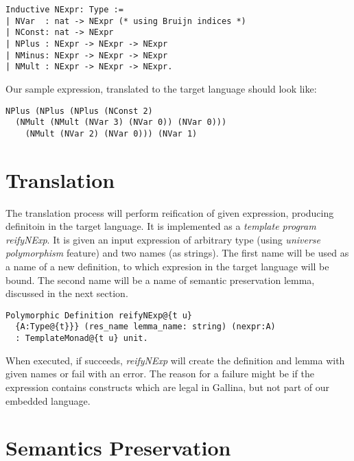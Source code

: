 \documentclass[sigplan]{acmart}\settopmatter{printfolios=true,printccs=false,printacmref=false}
\begin{document}
\begin{lstlisting}[language=Coq, mathescape=true,
  frame=single,basicstyle=\footnotesize]
Inductive NExpr: Type :=
| NVar  : nat -> NExpr (* using Bruijn indices *)
| NConst: nat -> NExpr
| NPlus : NExpr -> NExpr -> NExpr
| NMinus: NExpr -> NExpr -> NExpr
| NMult : NExpr -> NExpr -> NExpr.
\end{lstlisting}

Our sample expression, translated to the target language should look
like:

\begin{lstlisting}[language=Coq, mathescape=true,
  frame=single, basicstyle=\footnotesize,
  caption=Expression in target language, label=lst:texp]
NPlus (NPlus (NPlus (NConst 2)
  (NMult (NMult (NVar 3) (NVar 0)) (NVar 0)))
    (NMult (NVar 2) (NVar 0))) (NVar 1)
\end{lstlisting}
   
\section{Translation}

The translation process will perform reification of given expression,
producing definitoin in the target language. It is implemented as a
\textit{template program} \emph{reifyNExp}. It is given an input
expression of arbitrary type (using \textit{universe polymorphism}
feature) and two names (as strings). The first name will be used as a
name of a new definition, to which expresion in the target language
will be bound. The second name will be a name of semantic preservation
lemma, discussed in the next section.

\begin{lstlisting}[language=Coq, mathescape=true,
  frame=single, basicstyle=\footnotesize]
Polymorphic Definition reifyNExp@{t u}
  {A:Type@{t}}} (res_name lemma_name: string) (nexpr:A)
  : TemplateMonad@{t u} unit.
\end{lstlisting}

When executed, if succeeds, \emph{reifyNExp} will create the
definition and lemma with given names or fail with an error.  The
reason for a failure might be if the expression contains constructs
which are legal in Gallina, but not part of our embedded language.

\section{Semantics Preservation}
\end{document}
